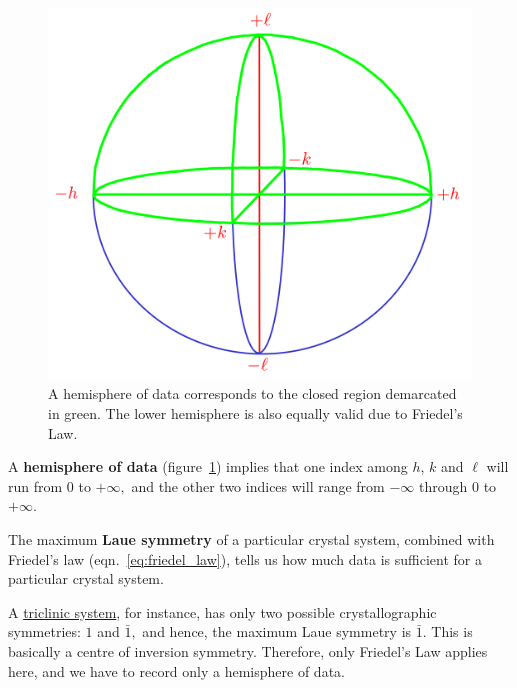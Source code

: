 \begin{figure}
	\centering
	\includegraphics[scale=0.12]{hemisphere_data.png}
	\caption{\label{fig:hemisphere}A hemisphere of data corresponds to the closed region demarcated in green. The lower hemisphere is also equally valid due to Friedel's Law.}
\end{figure}
	
A \textbf{hemisphere of data} (figure~\ref{fig:hemisphere}) implies that one index among $h$, $k$ and $\ell$ will run from $0$ to $+\infty,$ and the other two indices will range from $-\infty$ through $0$ to $+\infty.$
	
The maximum \textbf{Laue symmetry} of a particular crystal system, combined with Friedel's law (eqn.~\eqref{eq:friedel_law}), tells us how much data is sufficient for a particular crystal system.

A \ul{triclinic system}, for instance, has only two possible crystallographic symmetries: $1$ and $\bar{1},$ and hence, the maximum Laue symmetry is $\bar{1}.$  This is basically a centre of inversion symmetry. Therefore, only Friedel's Law applies here, and we have to record only a hemisphere of data.

